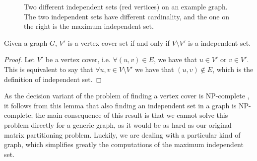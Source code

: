 \begin{figure}[h]
	\centering
{}
	\caption{Two different independent sets (red vertices) on an example graph. The two independent sets have different cardinality, and the one on the right is the maximum independent set.} \label{fig:is_example}
\end{figure}

\begin{lemma} 
	\label{lemma:is}
	Given a graph $G$, $V'$ is a vertex cover set if and only if $V \setminus V'$ is a independent set.
\end{lemma}
\begin{proof}
	Let $V'$ be a vertex cover, i.e. $\forall (u,v) \in E$, we have that $u \in V'$ or $v \in V'$. This is equivalent to say that $\forall u,v \in V \setminus V'$ we have that $(u,v) \notin E$, which is the definition of independent set.
\end{proof}

As the decision variant of the problem of finding a vertex cover is NP-complete \cite[Theorem 3.3]{np_book}, it follows from this lemma that also finding an independent set in a graph is NP-complete; the main consequence of this result is that we cannot solve this problem directly for a generic graph, as it would be as hard as our original matrix partitioning problem. Luckily, we are dealing with a particular kind of graph, which simplifies greatly the computations of the maximum independent set.

